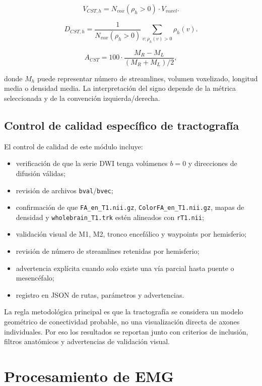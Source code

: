 \documentclass[12pt,a4paper]{article}
\begin{document}
\[
V_{CST,h}=N_{vox}(\rho_h>0)\cdot V_{voxel}.
\]

\[
D_{CST,h}=\frac{1}{N_{vox}(\rho_h>0)}
\sum_{v:\rho_h(v)>0}\rho_h(v).
\]

\[
A_{CST}=100\cdot
\frac{M_R-M_L}{(M_R+M_L)/2},
\]

donde $M_h$ puede representar número de streamlines, volumen voxelizado, longitud media o densidad media. La interpretación del signo depende de la métrica seleccionada y de la convención izquierda/derecha.

\subsection{Control de calidad específico de tractografía}

El control de calidad de este módulo incluye:

\begin{itemize}
    \item verificación de que la serie DWI tenga volúmenes $b=0$ y direcciones de difusión válidas;
    \item revisión de archivos \texttt{bval}/\texttt{bvec};
    \item confirmación de que \texttt{FA\_en\_T1.nii.gz}, \texttt{ColorFA\_en\_T1.nii.gz}, mapas de densidad y \texttt{wholebrain\_T1.trk} estén alineados con \texttt{rT1.nii};
    \item validación visual de M1, M2, tronco encefálico y waypoints por hemisferio;
    \item revisión de número de streamlines retenidas por hemisferio;
    \item advertencia explícita cuando solo existe una vía parcial hasta puente o mesencéfalo;
    \item registro en JSON de rutas, parámetros y advertencias.
\end{itemize}

La regla metodológica principal es que la tractografía se considera un modelo geométrico de conectividad probable, no una visualización directa de axones individuales. Por eso los resultados se reportan junto con criterios de inclusión, filtros anatómicos y advertencias de validación visual.

\section{Procesamiento de EMG}
\end{document}
